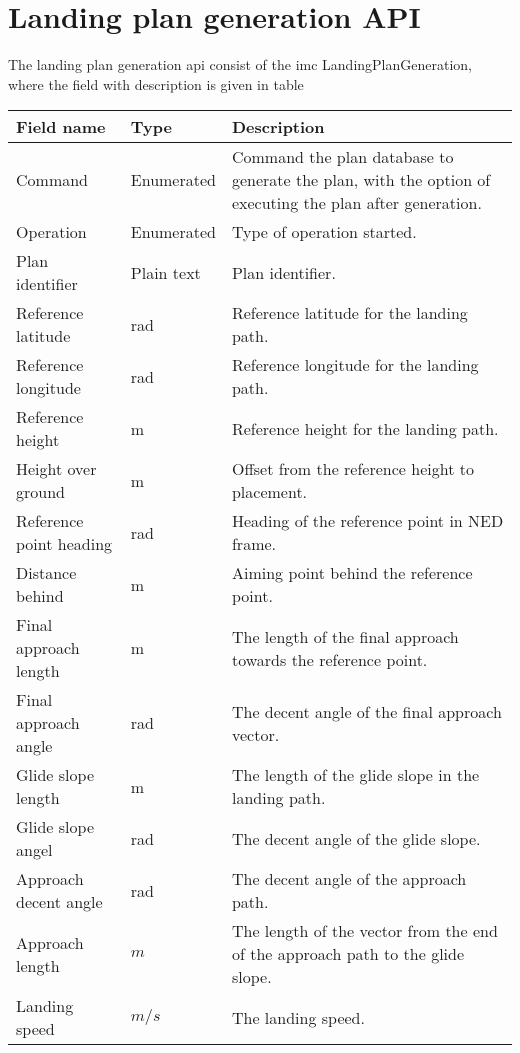 \chapter{Landing plan generation API}
The landing plan generation \gls{api} consist of the \gls{imc} LandingPlanGeneration, where the field with description is given in table 
\begin{table}
\centering
\begin{tabular}{| p{4cm} | p{2cm} | p{6cm} |}
\hline
\textbf{Field name}	& \textbf{Type}	& \textbf{Description} \\ \hline
Command								& Enumerated	& Command the plan database to generate the plan, with the option of executing the plan after generation. \\ \hline
Operation							& Enumerated	& Type of operation started.	\\ \hline
Plan identifier						& Plain text	& Plan identifier.	\\ \hline
Reference latitude					& rad			& Reference latitude for the landing path.	\\ \hline
Reference longitude					& rad			& Reference longitude for the landing path.	\\ \hline
Reference height					& m				& Reference height for the landing path.	\\ \hline
Height over ground					& m				& Offset from the reference height to placement.	\\ \hline
Reference point heading				& rad			& Heading of the reference point in NED frame.	\\ \hline
Distance behind						& m				& Aiming point behind the reference point.	\\ \hline
Final approach length				& m				& The length of the final approach towards the reference point.	\\ \hline
Final approach angle				& rad			& The decent angle of the final approach vector. 	\\ \hline
Glide slope length					& m				& The length of the glide slope in the landing path.	\\ \hline
Glide slope angel					& rad			& The decent angle of the glide slope.	\\ \hline
Approach decent angle				& rad			& The decent angle of the approach path.	\\ \hline
Approach length						& $m$			& The length of the vector from the end of the approach path to the glide slope.	\\ \hline
Landing speed						& $m/s$			& The landing speed.	\\ \hline

\end{tabular}
\end{table}

